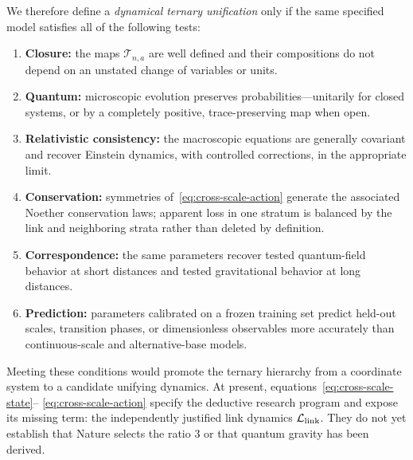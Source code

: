 \documentclass[11pt]{amsart}
\theoremstyle{definition}
\theoremstyle{remark}
\begin{document}
We therefore define a \emph{dynamical ternary unification} only if the same specified model
satisfies all of the following tests:
\begin{enumerate}[label=(U\arabic*)]
  \item \textbf{Closure:} the maps $\mathcal T_{n,a}$ are well defined and their compositions do
  not depend on an unstated change of variables or units.
  \item \textbf{Quantum:} microscopic evolution preserves probabilities---unitarily
  for closed systems, or by a completely positive, trace-preserving map when open.
  \item \textbf{Relativistic consistency:} the macroscopic equations are generally covariant and
  recover Einstein dynamics, with controlled corrections, in the appropriate limit.
  \item \textbf{Conservation:} symmetries of~\eqref{eq:cross-scale-action} generate the associated
  Noether conservation laws; apparent loss in one stratum is balanced by the link and neighboring
  strata rather than deleted by definition.
  \item \textbf{Correspondence:} the same parameters recover tested quantum-field behavior at
  short distances and tested gravitational behavior at long distances.
  \item \textbf{Prediction:} parameters calibrated on a frozen training set predict held-out
  scales, transition phases, or dimensionless observables more accurately than continuous-scale
  and alternative-base models.
\end{enumerate}
Meeting these conditions would promote the ternary hierarchy from a coordinate system to a
candidate unifying dynamics.  At present, equations~\eqref{eq:cross-scale-state}--
\eqref{eq:cross-scale-action} specify the deductive research program and expose its missing term:
the independently justified link dynamics $\mathcal L_{\rm link}$.  They do not yet establish
that Nature selects the ratio $3$ or that quantum gravity has been derived.
\end{document}
